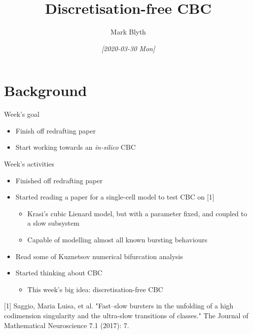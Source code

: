 \documentclass[presentation]{beamer}
\author{Mark Blyth}
\date{\textit{[2020-03-30 Mon]}}
\title{Discretisation-free CBC}
\begin{document}
\maketitle

\section{Background}
\label{sec:org74dc956}
\begin{frame}[label={sec:orgd33470a}]{Week's goal}
\begin{itemize}
\item Finish off redrafting paper
\item Start working towards an \emph{in-silico} CBC
\end{itemize}
\end{frame}

\begin{frame}[label={sec:org80e5494}]{Week's activities}
\begin{itemize}
\item Finished off redrafting paper
\item Started reading a paper for a single-cell model to test CBC on [1]
\begin{itemize}
\item Krasi's cubic Lienard model, but with a parameter fixed, and coupled to a slow subsystem
\item Capable of modelling almost all known bursting behaviours
\end{itemize}
\item Read some of Kuznetsov numerical bifurcation analysis
\item Started thinking about CBC
\begin{itemize}
\item This week's big idea: discretisation-free CBC
\end{itemize}
\end{itemize}

\vfill

[1] Saggio, Maria Luisa, et al. "Fast–slow bursters in the unfolding of a high codimension singularity and the ultra-slow transitions of classes." The Journal of Mathematical Neuroscience 7.1 (2017): 7.
\end{frame}
\end{document}
